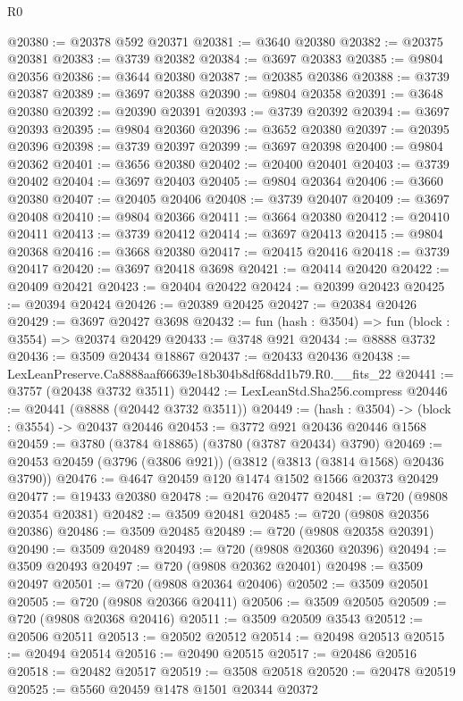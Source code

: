 \begin{lexlean}{R0}
\begin{coremodule}
@20380 := @20378 @592 @20371
@20381 := @3640 @20380
@20382 := @20375 @20381
@20383 := @3739 @20382
@20384 := @3697 @20383
@20385 := @9804 @20356
@20386 := @3644 @20380
@20387 := @20385 @20386
@20388 := @3739 @20387
@20389 := @3697 @20388
@20390 := @9804 @20358
@20391 := @3648 @20380
@20392 := @20390 @20391
@20393 := @3739 @20392
@20394 := @3697 @20393
@20395 := @9804 @20360
@20396 := @3652 @20380
@20397 := @20395 @20396
@20398 := @3739 @20397
@20399 := @3697 @20398
@20400 := @9804 @20362
@20401 := @3656 @20380
@20402 := @20400 @20401
@20403 := @3739 @20402
@20404 := @3697 @20403
@20405 := @9804 @20364
@20406 := @3660 @20380
@20407 := @20405 @20406
@20408 := @3739 @20407
@20409 := @3697 @20408
@20410 := @9804 @20366
@20411 := @3664 @20380
@20412 := @20410 @20411
@20413 := @3739 @20412
@20414 := @3697 @20413
@20415 := @9804 @20368
@20416 := @3668 @20380
@20417 := @20415 @20416
@20418 := @3739 @20417
@20420 := @3697 @20418 @3698
@20421 := @20414 @20420
@20422 := @20409 @20421
@20423 := @20404 @20422
@20424 := @20399 @20423
@20425 := @20394 @20424
@20426 := @20389 @20425
@20427 := @20384 @20426
@20429 := @3697 @20427 @3698
@20432 := fun (hash : @3504) => fun (block : @3554) => @20374 @20429
@20433 := @3748 @921
@20434 := @8888 @3732
@20436 := @3509 @20434 @18867
@20437 := @20433 @20436
@20438 := LexLeanPreserve.Ca8888aaf66639e18b304b8df68dd1b79.R0.__fits_22
@20441 := @3757 (@20438 @3732 @3511)
@20442 := LexLeanStd.Sha256.compress
@20446 := @20441 (@8888 (@20442 @3732 @3511))
@20449 := (hash : @3504) -> (block : @3554) -> @20437 @20446
@20453 := @3772 @921 @20436 @20446 @1568
@20459 := @3780 (@3784 @18865) (@3780 (@3787 @20434) @3790)
@20469 := @20453 @20459 (@3796 (@3806 @921)) (@3812 (@3813 (@3814 @1568) @20436 @3790))
@20476 := @4647 @20459 @120 @1474 @1502 @1566 @20373 @20429
@20477 := @19433 @20380
@20478 := @20476 @20477
@20481 := @720 (@9808 @20354 @20381)
@20482 := @3509 @20481
@20485 := @720 (@9808 @20356 @20386)
@20486 := @3509 @20485
@20489 := @720 (@9808 @20358 @20391)
@20490 := @3509 @20489
@20493 := @720 (@9808 @20360 @20396)
@20494 := @3509 @20493
@20497 := @720 (@9808 @20362 @20401)
@20498 := @3509 @20497
@20501 := @720 (@9808 @20364 @20406)
@20502 := @3509 @20501
@20505 := @720 (@9808 @20366 @20411)
@20506 := @3509 @20505
@20509 := @720 (@9808 @20368 @20416)
@20511 := @3509 @20509 @3543
@20512 := @20506 @20511
@20513 := @20502 @20512
@20514 := @20498 @20513
@20515 := @20494 @20514
@20516 := @20490 @20515
@20517 := @20486 @20516
@20518 := @20482 @20517
@20519 := @3508 @20518
@20520 := @20478 @20519
@20525 := @5560 @20459 @1478 @1501 @20344 @20372

\end{coremodule}
\end{lexlean}
